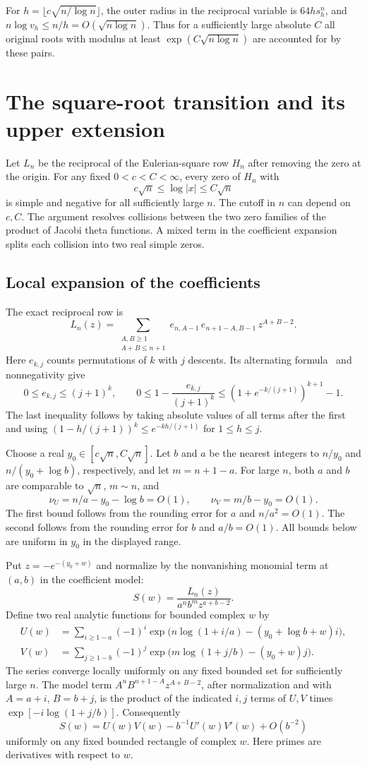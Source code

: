 \documentclass[11pt]{article}
\begin{document}
For $h=\lfloor c\sqrt{n/\log n}\rfloor$, the outer radius in the reciprocal variable is $64h s_h^n$, and $n\log v_h\le n/h=O(\sqrt{n\log n})$. Thus for a sufficiently large absolute $C$ all original roots with modulus at least $\exp(C\sqrt{n\log n})$ are accounted for by these pairs.
\section{The square-root transition and its upper extension}\label{theta}
Let $L_n$ be the reciprocal of the Eulerian-square row $H_n$ after removing the zero at the origin. For any fixed $0<c<C<\infty$, every zero of $H_n$ with
\[
 c\sqrt n\le \log |x|\le C\sqrt n
\]
is simple and negative for all sufficiently large $n$. The cutoff in $n$ can depend on $c,C$. The argument resolves collisions between the two zero families of the product of Jacobi theta functions. A mixed term in the coefficient expansion splits each collision into two real simple zeros.

\subsection{Local expansion of the coefficients}

The exact reciprocal row is
\[
 L_n(z)=\sum_{\substack{A,B\ge1\\ A+B\le n+1}}
 e_{n,A-1}\,e_{n+1-A,B-1}\,z^{A+B-2}.
\]
Here $e_{k,j}$ counts permutations of $k$ with $j$ descents. Its alternating formula~\cite{disk} and nonnegativity give
\[
 0\le e_{k,j}\le(j+1)^k,\qquad
 0\le 1-\frac{e_{k,j}}{(j+1)^k}
 \le (1+e^{-k/(j+1)})^{k+1}-1.
\]
The last inequality follows by taking absolute values of all terms after the first and using $(1-h/(j+1))^k\le e^{-kh/(j+1)}$ for $1\le h\le j$.

Choose a real $y_0\in[c\sqrt n,C\sqrt n]$. Let $b$ and $a$ be the nearest integers to $n/y_0$ and $n/(y_0+\log b)$, respectively, and let $m=n+1-a$. For large $n$, both $a$ and $b$ are comparable to $\sqrt n$, $m\sim n$, and
\[
 \nu_U=n/a-y_0-\log b=O(1),\qquad
 \nu_V=m/b-y_0=O(1).
\]
The first bound follows from the rounding error for $a$ and $n/a^2=O(1)$. The second follows from the rounding error for $b$ and $a/b=O(1)$. All bounds below are uniform in $y_0$ in the displayed range.

Put $z=-e^{-(y_0+w)}$ and normalize by the nonvanishing monomial term at $(a,b)$ in the coefficient model:
\[
 S(w)=\frac{L_n(z)}{a^n b^m z^{a+b-2}}.
\]
Define two real analytic functions for bounded complex $w$ by
\[
 \begin{aligned}
 U(w)&=\sum_{i\ge 1-a}(-1)^i
 \exp\!\big(n\log(1+i/a)-(y_0+\log b+w)i\big),\\
 V(w)&=\sum_{j\ge 1-b}(-1)^j
 \exp\!\big(m\log(1+j/b)-(y_0+w)j\big).
 \end{aligned}
\]
The series converge locally uniformly on any fixed bounded set for sufficiently large $n$. The model term $A^nB^{n+1-A}z^{A+B-2}$, after normalization and with $A=a+i$, $B=b+j$, is the product of the indicated $i,j$ terms of $U,V$ times $\exp[-i\log(1+j/b)]$. Consequently
\[
 S(w)=U(w)V(w)-b^{-1}U'(w)V'(w)+O(b^{-2})
 \tag{1}
\]
uniformly on any fixed bounded rectangle of complex $w$. Here primes are derivatives with respect to $w$.
\end{document}
